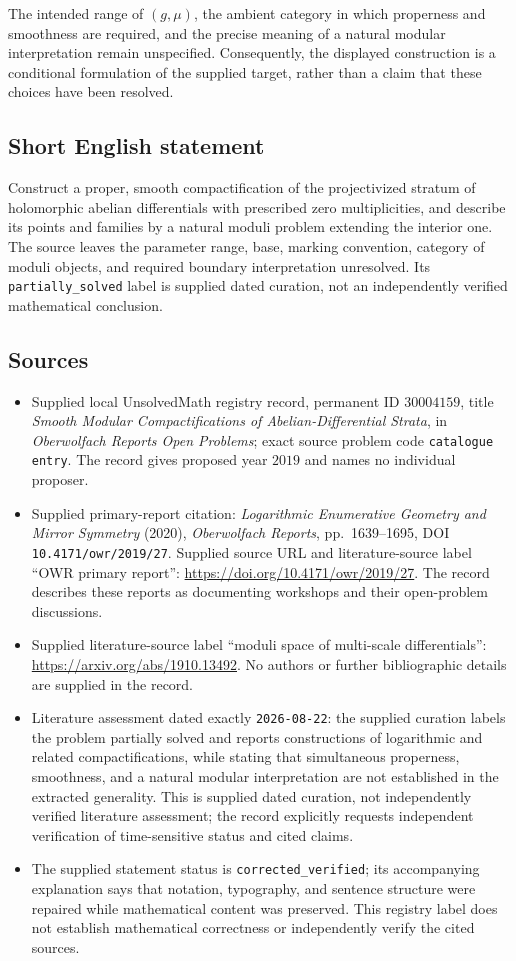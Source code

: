\documentclass[11pt]{article}
\begin{document}
The intended range of \((g,\mu)\), the ambient category in which properness and smoothness are required, and the precise meaning of a natural modular interpretation remain unspecified. Consequently, the displayed construction is a conditional formulation of the supplied target, rather than a claim that these choices have been resolved.
\subsection{Short English statement}
Construct a proper, smooth compactification of the projectivized stratum of holomorphic abelian differentials with prescribed zero multiplicities, and describe its points and families by a natural moduli problem extending the interior one. The source leaves the parameter range, base, marking convention, category of moduli objects, and required boundary interpretation unresolved. Its \texttt{partially\_solved} label is supplied dated curation, not an independently verified mathematical conclusion.
\subsection{Sources}
\begin{itemize}
\item Supplied local UnsolvedMath registry record, permanent ID \(30004159\), title \emph{Smooth Modular Compactifications of Abelian-Differential Strata}, in \emph{Oberwolfach Reports Open Problems}; exact source problem code \texttt{catalogue entry}. The record gives proposed year \(2019\) and names no individual proposer.
\item Supplied primary-report citation: \emph{Logarithmic Enumerative Geometry and Mirror Symmetry} (2020), \emph{Oberwolfach Reports}, pp.\ 1639--1695, DOI \texttt{10.4171/owr/2019/27}. Supplied source URL and literature-source label ``OWR primary report'': \url{https://doi.org/10.4171/owr/2019/27}. The record describes these reports as documenting workshops and their open-problem discussions.
\item Supplied literature-source label ``moduli space of multi-scale differentials'': \url{https://arxiv.org/abs/1910.13492}. No authors or further bibliographic details are supplied in the record.
\item Literature assessment dated exactly \texttt{2026-08-22}: the supplied curation labels the problem partially solved and reports constructions of logarithmic and related compactifications, while stating that simultaneous properness, smoothness, and a natural modular interpretation are not established in the extracted generality. This is supplied dated curation, not independently verified literature assessment; the record explicitly requests independent verification of time-sensitive status and cited claims.
\item The supplied statement status is \texttt{corrected\_verified}; its accompanying explanation says that notation, typography, and sentence structure were repaired while mathematical content was preserved. This registry label does not establish mathematical correctness or independently verify the cited sources.
\end{itemize}
\end{document}
